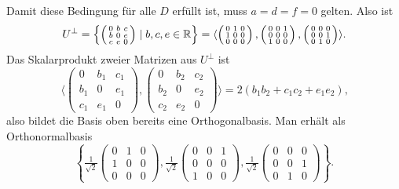 \begin{enumerate}
	Damit diese Bedingung für alle \( D \) erfüllt ist, muss \( a=d=f=0 \) gelten. Also ist
	\begin{equation*}
		U^\perp = \left\{ \left( \begin{smallmatrix}
			0 & b & c \\
			b & 0 & e \\
			c & e & 0
		\end{smallmatrix} \right) \mid b,c,e \in \mathbb{R} \right\} = \langle \left( \begin{smallmatrix}
			0 & 1 & 0 \\
			1 & 0 & 0 \\
			0 & 0 & 0 
		\end{smallmatrix} \right),\left( \begin{smallmatrix}
			0 & 0 & 1 \\
			0 & 0 & 0 \\
			1 & 0 & 0 
		\end{smallmatrix} \right),\left( \begin{smallmatrix}
			0 & 0 & 0 \\
			0 & 0 & 1 \\
			0 & 1 & 0
		\end{smallmatrix} \right) \rangle \text{.}
	\end{equation*}
	Das Skalarprodukt zweier Matrizen aus \( U^\perp \) ist
	\begin{equation*}
		\langle \left( \begin{smallmatrix}
			0 & b_1 & c_1 \\
			b_1 & 0 & e_1 \\
			c_1 & e_1 & 0
		\end{smallmatrix} \right),\left( \begin{smallmatrix}
			0 & b_2 & c_2 \\
			b_2 & 0 & e_2 \\
			c_2 & e_2 & 0 
		\end{smallmatrix} \right) \rangle = 2(b_1b_2+c_1c_2+e_1e_2)\text{,}
	\end{equation*}
	also bildet die Basis oben bereits eine Orthogonalbasis. Man erhält als Orthonormalbasis
	\begin{equation*}
		\left\{ \tfrac{1}{\sqrt{2}}\left( \begin{smallmatrix}
			0 & 1 & 0 \\
			1 & 0 & 0 \\
			0 & 0 & 0 
		\end{smallmatrix} \right), \tfrac{1}{\sqrt{2}}\left( \begin{smallmatrix}
			0 & 0 & 1 \\
			0 & 0 & 0 \\
			1 & 0 & 0
		\end{smallmatrix} \right), \tfrac{1}{\sqrt{2}}\left( \begin{smallmatrix}
			0 & 0 & 0 \\
			0 & 0 & 1 \\
			0 & 1 & 0 
		\end{smallmatrix} \right) \right\}\text{.}
	\end{equation*}

\end{enumerate}

